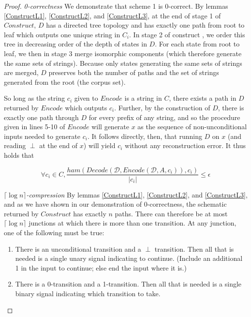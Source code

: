 \documentclass{article}
\theoremstyle{definition}
\begin{document}
\begin{proof}
\newline \noindent \textit{0-correctness } We demonstrate that scheme 1 is 0-correct.
By lemmas \ref{ConstructL1}, \ref{ConstructL2}, and \ref{ConstructL3}, at the end of 
stage 1 of $Construct$, $D$ has a directed tree topology and has exactly one path 
from root to leaf which outputs one unique string in $C_i$.  In stage 2 of construct ,
we order this tree in decreasing order of the depth of states in $D$.  For each state 
from root to leaf, we then in stage 3 merge isomorphic components 
(which therefore generate the same 
sets of strings).  Because only states generating the same sets of strings are merged, 
$D$ preserves both the number of paths and the 
set of strings generated from the root (the corpus set).   

So long as the string $c_i$ given to $Encode$ is a string in $C$, there exists a path 
in $D$ returned by $Encode$ which outputs $c_i$.  Further, by the construction of 
$D$, there is exactly one path through $D$ for every prefix of any string, and so the 
procedure given in lines 5-10 of $Encode$ will generate $x$ as the sequence 
of non-unconditional inputs needed to generate $c_i$.  It follows directly, then, 
that running $D$ on $x$ (and reading $\perp$ at the end of $x$) will yield $c_i$ 
without any reconstruction error.  It thus holds that 

\[ \forall c_i \in C, \frac{ham(Decode(\mathcal{D},Encode(\mathcal{D}, A, c_i)), c_i)}{\lvert c_i \rvert} \leq \epsilon \]

\noindent \textit{\(\lceil \log{n} \rceil \)-compression } By lemmas \ref{ConstructL1}, \ref{ConstructL2}, 
and \ref{ConstructL3}, and as we have shown in our demonstration of 0-correctness, the 
schematic returned by $Construct$ has exactly $n$ paths.  There can therefore be at most 
$\lceil \log{n} \rceil$ junctions at which there is more than one transition.  At any junction, one 
of the following must be true:

\begin{enumerate}
\item{There is an unconditional transition and a $\perp$ transition.  Then all that is needed 
is a single unary signal indicating to continue.  (Include an additional 1 in the input to continue; 
else end the input where it is.)}
\item{There is a 0-transition and a 1-transition.  Then all that is needed is a single 
binary signal indicating which transition to take.}
\end{enumerate}


\end{proof}
\end{document}

